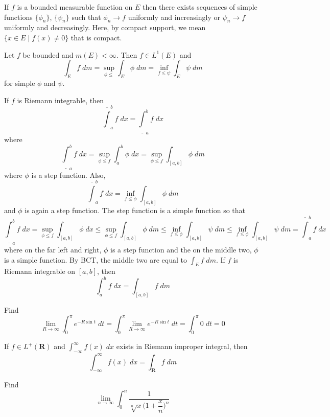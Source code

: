 \vspace{2ex}
\begin{thm}
If $f$ is a bounded measurable function on $E$ then there exists sequences of simple functions $\{\phi _{n}\}$, $\{\psi _{n}\}$ such that $\phi _{n}\rightarrow f$ uniformly and increasingly or $\psi _{n}\rightarrow f$ uniformly and decreasingly. Here, by compact support, we mean $\{x\in E \;|\; f(x)\ne 0\}$ that is compact. 
\end{thm}
\vspace{2ex}
\begin{thm}
Let $f$ be bounded and $m(E)<\infty $. Then $f\in L^{1}(E)$ and
\[\int _{E}f\;d m=\sup_{\phi \leq}\int _{E}\phi \;d m=\inf_{f\leq \psi }\int _{E}\psi \;d m\]
for simple $\phi$ and $\psi $.
\end{thm}
\vspace{2ex}
\begin{rmk}
If $f$ is Riemann integrable, then 
\[\overline{\int} ^{b}_{a}f\;dx=\underline{\int} ^{b}_{a}f\;dx\]
where 
\[\underline{\int}_{a}^{b}f\;dx=\sup_{\phi \leq f}\int _{a}^{b}\phi \;dx=\sup_{\phi \leq f}\int _{[a,b]}\phi\;d m \]
where $\phi $ is a step function. Also,
\[\overline{\int }^{b}_{a}f\;dx=\inf_{f\leq \phi }\int _{[a,b]}\phi \;d m\]
and $\phi $ is again a step function. The step function is a simple function so that
\[\underline{\int }^{b}_{a}f\;dx=\sup_{\phi \leq f}\int _{[a,b]}\phi\;dx\leq \sup_{\phi \leq f}\int _{[a,b]}\phi \;d m\leq \inf_{f\leq \phi }\int _{[a,b]}\psi \;d m\leq \inf_{f\leq \phi }\int _{[a,b]}\psi\;d m =\overline{\int }^{b}_{a}f\;dx \]
where on the far left and right, $\phi $ is a step function and the on the middle two, $\phi $ is a simple  function. By BCT, the middle two are equal to $\int _{E}f\;d m$. If $f$ is Riemann integrable on $[a,b]$, then 
\[\int ^{b}_{a}f\;dx=\int _{[a,b]}f\;d m\]
\end{rmk}
\vspace{2ex}
\begin{ex}
Find
\[\lim _{R\rightarrow \infty }\int ^{\pi }_{0}e^{-R\sin t}\;dt=\int ^{\pi }_{0}\lim _{R\rightarrow \infty }e^{-R\sin t}\;dt=\int ^{\pi }_{0}0\;dt=0\]
\end{ex}
\vspace{2ex}
\begin{thm}
If $f\in L^{+}({\bm R})$ and $\int ^{\infty }_{-\infty }f(x)\;dx$ exists in Riemann improper integral, then
\[\int ^{\infty }_{-\infty }f(x)\;dx=\int _{{\bm R}}f\;d m\]
\end{thm}
\vspace{2ex}
\begin{ex}
Find
\[\lim _{n\rightarrow \infty }\int ^{n}_{0}\dfrac{1}{\sqrt[n]{x}\Big(1+\dfrac{x}{n}\Big)^{n}}\]
\end{ex}
